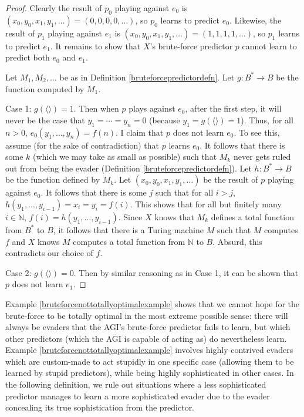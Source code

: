 \documentclass{article}
\begin{document}
\begin{proof}
    Clearly the result of $p_0$ playing against $e_0$ is
    $(x_0,y_0,x_1,y_1,\ldots)=(0,0,0,0,\ldots)$, so $p_0$ learns to predict $e_0$.
    Likewise, the result of $p_1$ playing against $e_1$ is
    $(x_0,y_0,x_1,y_1,\ldots)=(1,1,1,1,\ldots)$, so $p_1$ learns to predict $e_1$.
    It remains to show that $X$'s brute-force predictor $p$ cannot learn to predict
    both $e_0$ and $e_1$.

    Let $M_1,M_2,\ldots$ be as in Definition \ref{bruteforcepredictordefn}.
    Let $g:B^*\to B$ be the function computed by $M_1$.

    Case 1: $g(\langle\rangle)=1$. Then when $p$ plays against $e_0$,
    after the first step, it will never be the case that
    $y_1=\cdots=y_n=0$ (because $y_1=g(\langle\rangle)=1$).
    Thus, for all $n>0$, $e_0(y_1,\ldots,y_n)=f(n)$.
    I claim that $p$ does not learn $e_0$.
    To see this, assume (for the sake of contradiction)
    that $p$ learns $e_0$. It follows that there is some $k$ (which we may take
    as small as possible) such that $M_k$ never gets ruled out from being the
    evader (Definition \ref{bruteforcepredictordefn}). Let $h:B^*\to B$ be the
    function defined by $M_k$.
    Let $(x_0,y_0,x_1,y_1,\ldots)$ be the result of $p$ playing against $e_0$.
    It follows that there is some $j$ such that for all $i>j$,
    $h(y_1,\ldots,y_{i-1})=x_i=y_i=f(i)$.
    This shows that for all but finitely many $i\in\mathbb N$,
    $f(i)=h(y_1,\ldots,y_{i-1})$. Since $X$ knows that $M_k$ defines a total
    function from $B^*$ to $B$, it follows that
    there is a Turing machine $M$ such that $M$ computes $f$ and $X$ knows
    $M$ computes a total function from $\mathbb N$ to $B$. Absurd, this
    contradicts our choice of $f$.

    Case 2: $g(\langle\rangle)=0$. Then by similar reasoning as in Case 1,
    it can be shown that $p$ does not learn $e_1$.
\end{proof}

Example \ref{bruteforcenottotallyoptimalexample} shows that we cannot
hope for the brute-force to be totally optimal in the most extreme possible sense:
there will always be evaders that the AGI's brute-force predictor
fails to learn, but which other
predictors (which the AGI is capable of acting as)
do nevertheless learn. Example \ref{bruteforcenottotallyoptimalexample} involves
highly contrived evaders which are custom-made to act stupidly in one specific case
(allowing them to be learned by stupid predictors), while being
highly sophisticated in other cases. In the following definition, we rule out
situations where a less sophisticated predictor manages to learn a
more sophisticated evader due to the evader concealing its true sophistication from
the predictor.
\end{document}
